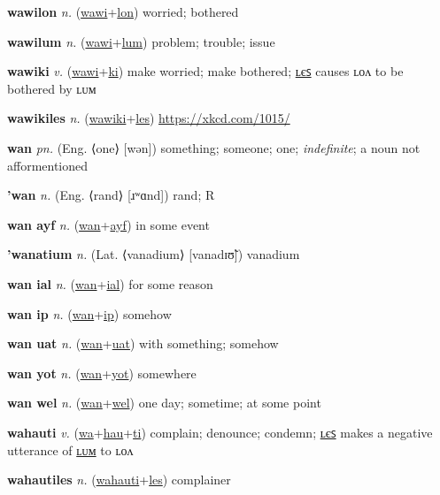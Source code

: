 \textbf{\hypertarget{wawilon}{wawilon}} \textit{n.} (\hyperlink{wawi}{wawi}+\allowbreak \hyperlink{lon}{lon})
worried; bothered

\textbf{\hypertarget{wawilum}{wawilum}} \textit{n.} (\hyperlink{wawi}{wawi}+\allowbreak \hyperlink{lum}{lum})
problem; trouble; issue

\textbf{\hypertarget{wawiki}{wawiki}} \textit{v.} (\hyperlink{wawi}{wawi}+\allowbreak \hyperlink{ki}{ki})
make worried; make bothered; \hyperlink{wawikiles}{ʟєꜱ} causes ʟᴏᴧ to be bothered by ʟᴜᴍ

\textbf{\hypertarget{wawikiles}{wawikiles}} \textit{n.} (\hyperlink{wawiki}{wawiki}+\allowbreak \hyperlink{les}{les})
\url{https://xkcd.com/1015/}

\textbf{\hypertarget{wan}{wan}} \textit{pn.} (Eng. ⟨one⟩ [wən])
something; someone; one; \textit{indefinite}; a noun not afformentioned

\textbf{\hypertarget{'wan}{'wan}} \textit{n.} (Eng. ⟨rand⟩ [ɹʷɑnd])
rand; R

\textbf{\hypertarget{wan ayf}{wan ayf}} \textit{n.} (\hyperlink{wan}{wan}+\allowbreak \hyperlink{ayf}{ayf})
in some event

\textbf{\hypertarget{'wanatium}{'wanatium}} \textit{n.} (Lat. ⟨vanadium⟩ [vanadɪʊ̃])
vanadium

\textbf{\hypertarget{wan ial}{wan ial}} \textit{n.} (\hyperlink{wan}{wan}+\allowbreak \hyperlink{ial}{ial})
for some reason

\textbf{\hypertarget{wan ip}{wan ip}} \textit{n.} (\hyperlink{wan}{wan}+\allowbreak \hyperlink{ip}{ip})
somehow

\textbf{\hypertarget{wan uat}{wan uat}} \textit{n.} (\hyperlink{wan}{wan}+\allowbreak \hyperlink{uat}{uat})
with something; somehow

\textbf{\hypertarget{wan yot}{wan yot}} \textit{n.} (\hyperlink{wan}{wan}+\allowbreak \hyperlink{yot}{yot})
somewhere

\textbf{\hypertarget{wan wel}{wan wel}} \textit{n.} (\hyperlink{wan}{wan}+\allowbreak \hyperlink{wel}{wel})
one day; sometime; at some point

\textbf{\hypertarget{wahauti}{wahauti}} \textit{v.} (\hyperlink{wa}{wa}+\allowbreak \hyperlink{hau}{hau}+\allowbreak \hyperlink{ti}{ti})
complain; denounce; condemn; \hyperlink{wahautiles}{ʟєꜱ} makes a negative utterance of \hyperlink{wahautilum}{ʟᴜᴍ} to ʟᴏᴧ

\textbf{\hypertarget{wahautiles}{wahautiles}} \textit{n.} (\hyperlink{wahauti}{wahauti}+\allowbreak \hyperlink{les}{les})
complainer

